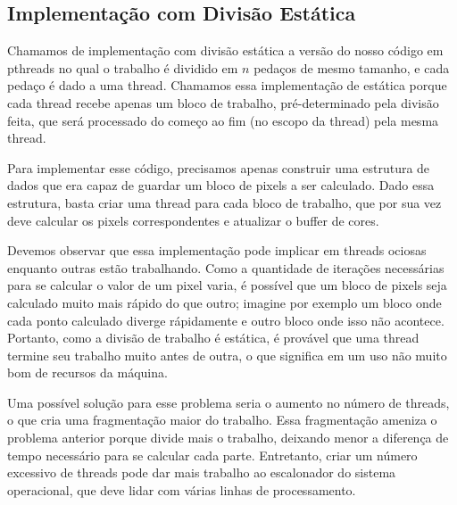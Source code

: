 \documentclass[12pt]{article}
\begin{document}
\subsection{Implementação com Divisão Estática}
Chamamos de implementação com divisão estática a versão do nosso 
código em pthreads no qual o trabalho é dividido em $n$ pedaços de mesmo 
tamanho, e cada pedaço é dado a uma thread. Chamamos essa implementação
de estática porque cada thread recebe apenas um bloco de trabalho,
pré-determinado pela divisão feita, que será processado do começo ao
fim (no escopo da thread) pela mesma thread.

Para implementar esse código, precisamos apenas construir uma estrutura
de dados que era capaz de guardar um bloco de pixels a ser calculado.
Dado essa estrutura, basta criar uma thread para cada bloco de trabalho,
que por sua vez deve calcular os pixels correspondentes e atualizar o 
buffer de cores.

Devemos observar que essa implementação pode implicar em threads ociosas
enquanto outras estão trabalhando. Como a quantidade de iterações
necessárias para se calcular o valor de um pixel varia, é possível que
um bloco de pixels seja calculado muito mais rápido do que outro; 
imagine por exemplo um bloco onde cada ponto calculado diverge 
rápidamente e outro bloco onde isso não acontece. Portanto, como a 
divisão de trabalho é estática, é provável que uma thread termine seu
trabalho muito antes de outra, o que significa em um uso não muito bom
de recursos da máquina.

Uma possível solução para esse problema seria o aumento no número de 
threads, o que cria uma fragmentação maior do trabalho. Essa 
fragmentação ameniza o problema anterior porque divide mais o trabalho,
deixando menor a diferença de tempo necessário para se calcular cada 
parte. Entretanto, criar um número excessivo de threads pode dar mais
trabalho ao escalonador do sistema operacional, que deve lidar com 
várias linhas de processamento.
\end{document}

